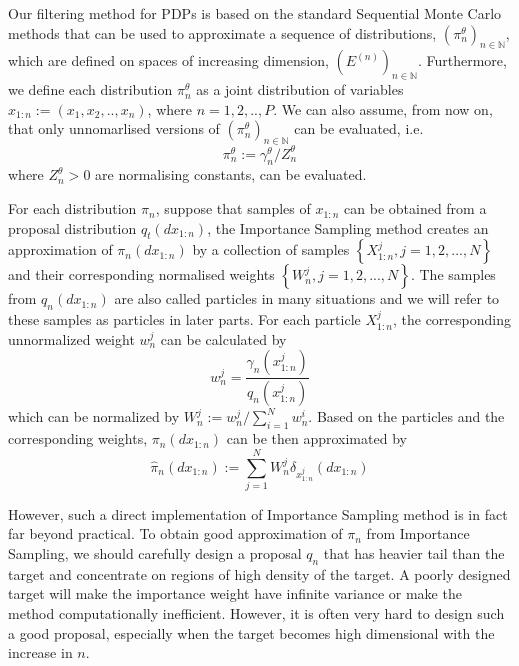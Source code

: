 \documentclass[12pt,a4paper]{article}
\begin{document}
Our filtering method for PDPs is based on the standard Sequential Monte Carlo methods that can be used to approximate a sequence of distributions, $(\pi_n^{\theta})_{n \in \mathbb{N}}$, which are defined on spaces of increasing dimension, $\left(E^{(n)}\right)_{n \in \mathbb{N}}$. Furthermore, we define each distribution $\pi_n^{\theta}$ as a joint distribution of variables $x_{1:n}:= (x_1,x_2,..,x_n)$, where $n = 1,2,..,P$.
We can also assume, from now on, that only unnomarlised versions of $(\pi_n^{\theta})_{n \in \mathbb{N}}$ can be evaluated, i.e.
$$\pi_n^{\theta} := \gamma_n^{\theta}/Z_n^{\theta}$$
where $Z_n^{\theta} >0$ are normalising constants, can be evaluated.

For each distribution $\pi_n$, suppose that samples of $x_{1:n}$ can be obtained from a proposal distribution $q_t(dx_{1:n})$, the Importance Sampling method creates an approximation of $\pi_n(dx_{1:n})$ by a collection of samples $\left\{X_{1:n}^j, j=1,2,...,N\right\}$ and their corresponding normalised weights $\left\{W_n^j, j= 1,2,...,N\right\}$. The samples from $q_n(dx_{1:n})$ are also called particles in many situations and we will refer to these samples as particles in later parts. For each particle $X_{1:n}^j$, the corresponding unnormalized weight $w_n^j$ can be calculated by \begin{equation}
    \label{Standard SMC -  IS unnormalized weight}
    w_n^j = \frac{\gamma_n\left(x_{1:n}^j\right)}{q_n\left(x_{1:n}^j\right)}
\end{equation}
which can be normalized by $W_n^j := w_n^j/\sum_{i=1}^{N}w_n^i$. Based on the particles and the corresponding weights, $\pi_n(dx_{1:n})$ can be then approximated by 
\begin{equation}
    \label{Standard SMC - IS target approx}
    \hat{\pi}_n(dx_{1:n}) := \sum_{j=1}^{N} W_n^j \delta_{x_{1:n}^j}(dx_{1:n})
\end{equation}

However, such a direct implementation of Importance Sampling method is in fact far beyond practical. To obtain good approximation of $\pi_n$ from Importance Sampling, we should carefully design a proposal $q_n$ that has heavier tail than the target and concentrate on regions of high density of the target. A poorly designed target will make the importance weight have infinite variance or make the method computationally inefficient. However, it is often very hard to design such a good proposal, especially when the target becomes high dimensional with the increase in $n$. 
\end{document}

